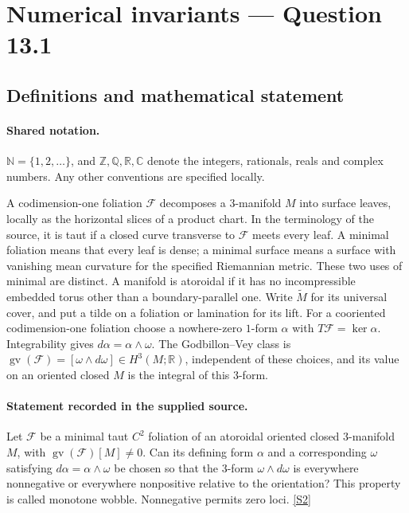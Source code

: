 \documentclass[11pt]{article}
\newcommand{\sref}[2]{\hyperlink{source:#1:#2}{[S#2]}}
\begin{document}
\section{Numerical invariants — Question 13.1}\label{statement}

\subsection{Definitions and mathematical statement}

\paragraph{Shared notation.}$\mathbb N=\{1,2,\ldots\}$, and $\mathbb Z,\mathbb Q,\mathbb R,\mathbb C$ denote the integers, rationals, reals and complex numbers. Any other conventions are specified locally.


A codimension-one foliation $\mathcal F$ decomposes a $3$-manifold $M$ into surface leaves, locally as the horizontal slices of a product chart. In the terminology of the source, it is taut if a closed curve transverse to $\mathcal F$ meets every leaf. A minimal foliation means that every leaf is dense; a minimal surface means a surface with vanishing mean curvature for the specified Riemannian metric. These two uses of minimal are distinct. A manifold is atoroidal if it has no incompressible embedded torus other than a boundary-parallel one. Write $\widetilde M$ for its universal cover, and put a tilde on a foliation or lamination for its lift. For a cooriented codimension-one foliation choose a nowhere-zero $1$-form $\alpha$ with $T\mathcal F=\ker\alpha$. Integrability gives $d\alpha=\alpha\wedge\omega$. The Godbillon--Vey class is $\operatorname{gv}(\mathcal F)=[\omega\wedge d\omega]\in H^3(M;\mathbb R)$, independent of these choices, and its value on an oriented closed $M$ is the integral of this $3$-form.
\paragraph{Statement recorded in the supplied source.}
Let $\mathcal F$ be a minimal taut $C^2$ foliation of an atoroidal oriented closed $3$-manifold $M$, with $\operatorname{gv}(\mathcal F)[M]\ne0$. Can its defining form $\alpha$ and a corresponding $\omega$ satisfying $d\alpha=\alpha\wedge\omega$ be chosen so that the $3$-form $\omega\wedge d\omega$ is everywhere nonnegative or everywhere nonpositive relative to the orientation? This property is called monotone wobble. Nonnegative permits zero loci. \sref{statement}{2}
\end{document}
